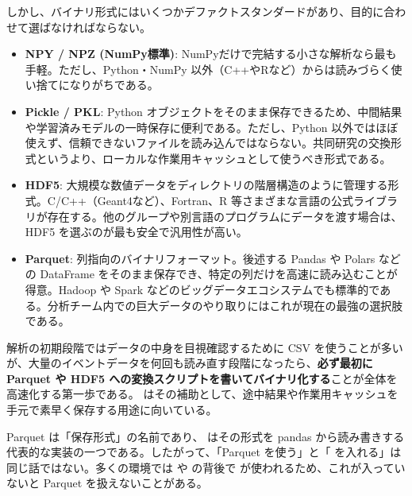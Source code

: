 しかし、バイナリ形式にはいくつかデファクトスタンダードがあり、目的に合わせて選ばなければならない。

\begin{itemize}
    \item \textbf{NPY / NPZ (NumPy標準)}: NumPyだけで完結する小さな解析なら最も手軽。ただし、Python・NumPy 以外（C++やRなど）からは読みづらく使い捨てになりがちである。
    \item \textbf{Pickle / PKL}: Python オブジェクトをそのまま保存できるため、中間結果や学習済みモデルの一時保存に便利である。ただし、Python 以外ではほぼ使えず、信頼できないファイルを読み込んではならない。共同研究の交換形式というより、ローカルな作業用キャッシュとして使うべき形式である。
    \item \textbf{HDF5}: 大規模な数値データをディレクトリの階層構造のように管理する形式。C/C++（Geant4など）、Fortran、R 等さまざまな言語の公式ライブラリが存在する。他のグループや別言語のプログラムにデータを渡す場合は、HDF5 を選ぶのが最も安全で汎用性が高い。
    \item \textbf{Parquet}: 列指向のバイナリフォーマット。後述する Pandas や Polars などの DataFrame をそのまま保存でき、特定の列だけを高速に読み込むことが得意。Hadoop や Spark などのビッグデータエコシステムでも標準的である。分析チーム内での巨大データのやり取りにはこれが現在の最強の選択肢である。
\end{itemize}

解析の初期段階ではデータの中身を目視確認するために CSV を使うことが多いが、大量のイベントデータを何回も読み直す段階になったら、\textbf{必ず最初に Parquet や HDF5 への変換スクリプトを書いてバイナリ化する}ことが全体を高速化する第一歩である。 はその補助として、途中結果や作業用キャッシュを手元で素早く保存する用途に向いている。

Parquet は「保存形式」の名前であり、 はその形式を pandas から読み書きする代表的な実装の一つである。したがって、「Parquet を使う」と「 を入れる」は同じ話ではない。多くの環境では  や  の背後で  が使われるため、これが入っていないと Parquet を扱えないことがある。

